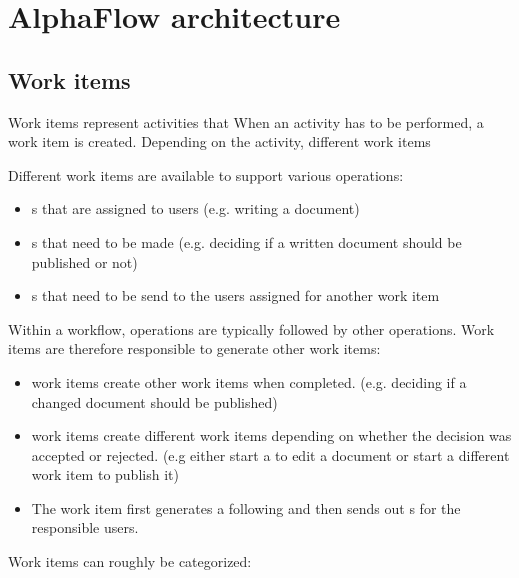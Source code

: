 \chapter{AlphaFlow architecture}

\section{Work items}

Work items represent activities that 
When an activity has to be performed, a work item is created. Depending on the activity,
different work items 

Different work items are available to support various operations:

\begin{itemize}
    \item {}s that are assigned to users (e.g. writing a document)
    \item {}s that need to be made (e.g. deciding if a written document should be published or not)
    \item {}s that need to be send to the users assigned for another work item
\end{itemize}

Within a workflow, operations are typically followed by other operations. Work
items are therefore responsible to generate other work items:

\begin{itemize}
    \item {} work items create other work items when completed. (e.g. deciding if a changed document should be published)
    \item {} work items create different work items depending on whether the decision was accepted or rejected. (e.g either start a  to edit a document or start a different work item to publish it)
    \item The  work item first generates a following  and then sends out s for the responsible users.
\end{itemize}

Work items can roughly be categorized:

